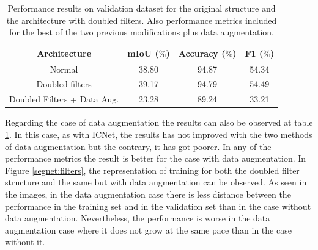 \begin{table}[h!]
  \begin{center}
    
    \begin{tabular}{|c|c|c|c|} %
      \textbf{Architecture} & \textbf{mIoU ($\%$)} & \textbf{Accuracy ($\%$)} & \textbf{F1 ($\%$)} \\
      \hline
      Normal & 38.80 & 94.87 & 54.34\\
      \hline
      Doubled filters & 39.17 & 94.79  & 54.49 \\  
      \hline
      Doubled Filters + Data Aug. & 23.28 & 89.24 & 33.21\\
    \end{tabular}
    \caption{Performance results on validation dataset for the original structure and the architecture with doubled filters. Also performance metrics included for the best of the two previous modifications plus data augmentation.}
    \label{segnet:table1}
  \end{center}
\end{table}

Regarding the case of data augmentation the results can also be observed at table \ref{segnet:table1}. In this case, as with ICNet, the results has not improved with the two methods of data augmentation but the contrary, it has got poorer. In any of the performance metrics the result is better for the case with data augmentation. In Figure \ref{segnet:filters}, the representation of training for both the doubled filter structure and the same but with data augmentation can be observed. As seen in the images, in the data augmentation case there is less distance between the performance in the training set and in the validation set than in the case without data augmentation. Nevertheless, the performance is worse in the data augmentation case where it does not grow at the same pace than in the case without it.\newline

